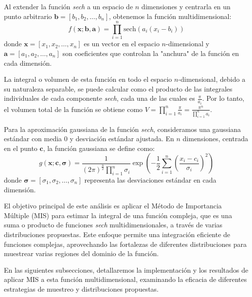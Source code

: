 \documentclass{article}
\begin{document}
Al extender la función \textit{sech} a un espacio de \( n \) dimensiones y centrarla en un punto arbitrario \( \mathbf{b} = [b_1, b_2, \ldots, b_n] \), obtenemos la función multidimensional:
\[ f(\mathbf{x}; \mathbf{b}, \mathbf{a}) = \prod_{i=1}^{n} \text{sech}(a_i(x_i - b_i)) \]
donde \( \mathbf{x} = [x_1, x_2, \ldots, x_n] \) es un vector en el espacio \( n \)-dimensional y \( \mathbf{a} = [a_1, a_2, \ldots, a_n] \) son coeficientes que controlan la "anchura" de la función en cada dimensión.

La integral o volumen de esta función en todo el espacio \( n \)-dimensional, debido a su naturaleza separable, se puede calcular como el producto de las integrales individuales de cada componente \textit{sech}, cada una de las cuales es \( \frac{\pi}{a_i} \). Por lo tanto, el volumen total de la función se obtiene como \( V = \prod_{i=1}^{n} \frac{\pi}{a_i} = \frac{\pi^n}{\prod_{i=1}^{n} a_i} \).

Para la aproximación gaussiana de la función \textit{sech}, consideramos una gaussiana estándar con media 0 y desviación estándar ajustada. En \( n \) dimensiones, centrada en el punto \( \mathbf{c} \), la función gaussiana se define como:
\[ g(\mathbf{x}; \mathbf{c}, \boldsymbol{\sigma}) = \frac{1}{(2\pi)^{\frac{n}{2}} \prod_{i=1}^{n} \sigma_i} \exp \left( -\frac{1}{2} \sum_{i=1}^{n} \left( \frac{x_i - c_i}{\sigma_i} \right)^2 \right) \]
donde \( \boldsymbol{\sigma} = [\sigma_1, \sigma_2, \ldots, \sigma_n] \) representa las desviaciones estándar en cada dimensión.

El objetivo principal de este análisis es aplicar el Método de Importancia Múltiple (MIS) para estimar la integral de una función compleja, que es una suma o producto de funciones \textit{sech} multidimensionales, a través de varias distribuciones propuestas. Este enfoque permite una integración eficiente de funciones complejas, aprovechando las fortalezas de diferentes distribuciones para muestrear varias regiones del dominio de la función.

En las siguientes subsecciones, detallaremos la implementación y los resultados de aplicar MIS a esta función multidimensional, examinando la eficacia de diferentes estrategias de muestreo y distribuciones propuestas.
\end{document}
